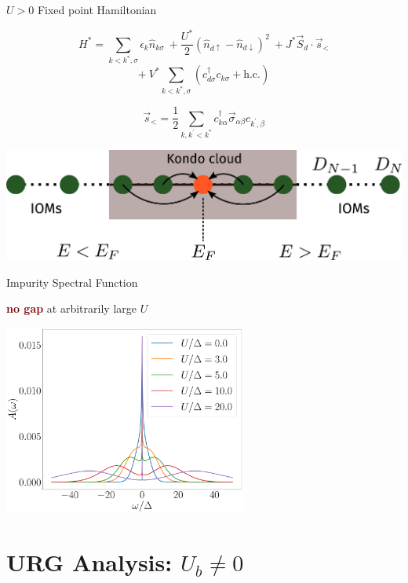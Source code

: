 \documentclass[aspectratio=169]{beamer}
\newcommand{\focus}[1]{\textcolor{maroon}{\textbf{#1}}}
\begin{document}
\begin{frame}[noframenumbering]{\(U > 0\) Fixed point Hamiltonian}
\begin{minipage}{0.48\textwidth}
	\[H^* = \sum_{k < k^*,\sigma}\epsilon_{k}\hat{n}_{k\sigma} ~ + \frac{U^*}{2}\left(\hat n_{d \uparrow} - \hat n_{d \downarrow}\right)^2 ~ + J^* \vec{S}_d\cdot \vec{s}_<\]
	\[+ ~ V^* \sum_{k < k^*,\sigma}\left(c^\dagger_{d\sigma}c_{k\sigma} + \text{h.c.}\right)\]

	\vspace*{20pt}
	\[\vec{s}_< = \frac{1}{2}\sum_{k,k^\prime < k^*}c^{\dagger}_{k\alpha}\vec{\sigma}_{\alpha\beta}c_{k^\prime,\beta}\]
\end{minipage}
\begin{minipage}{0.5\textwidth}
	\includegraphics[width=\textwidth]{figures/kondo_fp_1D.pdf}
\end{minipage}
\end{frame}

\begin{frame}[noframenumbering]{Impurity Spectral Function}
\centering

\focus{no gap} at arbitrarily large $U$

\includegraphics[width=0.6\textwidth]{./figures/gen_siam_spec_func.pdf}

\end{frame}

\section{URG Analysis: \(U_b \neq 0\)}
\label{urg-2}
\end{document}
